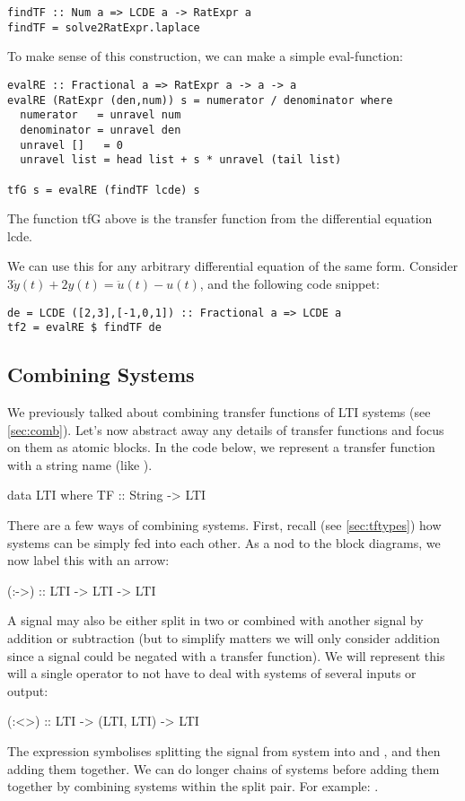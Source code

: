 \begin{verbatim}
findTF :: Num a => LCDE a -> RatExpr a
findTF = solve2RatExpr.laplace
\end{verbatim}

To make sense of this construction, we can make a simple eval-function:

\begin{verbatim}
evalRE :: Fractional a => RatExpr a -> a -> a
evalRE (RatExpr (den,num)) s = numerator / denominator where
  numerator   = unravel num
  denominator = unravel den
  unravel []   = 0
  unravel list = head list + s * unravel (tail list)

tfG s = evalRE (findTF lcde) s
\end{verbatim}

The function tfG above is the transfer function from the differential equation lcde.

We can use this for any arbitrary differential equation of the same form. Consider $3\dot{y}(t)+2y(t)=\ddot{u}(t)-u(t)$, and the following code snippet:

\begin{verbatim}
de = LCDE ([2,3],[-1,0,1]) :: Fractional a => LCDE a
tf2 = evalRE $ findTF de
\end{verbatim}

\subsection{Combining Systems}\label{sec:combsys}

We previously talked about combining transfer functions of LTI systems (see \ref{sec:comb}). Let's now abstract away any details of transfer functions and focus on them as atomic blocks.
In the code below, we represent a transfer function with a string name (like ).
\begin{code}
data LTI where
  TF :: String -> LTI
\end{code}
There are a few ways of combining systems. First, recall (see \ref{sec:tftypes}) how systems can be simply fed into each other. As a nod to the block diagrams, we now label this with an arrow:
\begin{code}
  (:->) :: LTI -> LTI -> LTI
\end{code}
A signal may also be either split in two or combined with another signal by addition or subtraction (but to simplify matters we will only consider addition since a signal could be negated with a transfer function). We will represent this will a single operator to not have to deal with systems of several inputs or output:
\begin{code}
  (:<>) :: LTI -> (LTI, LTI) -> LTI
\end{code}
The expression  symbolises splitting the signal from system  into  and , and then adding them together. We can do longer chains of systems before adding them together by combining systems within the split pair. For example: .


